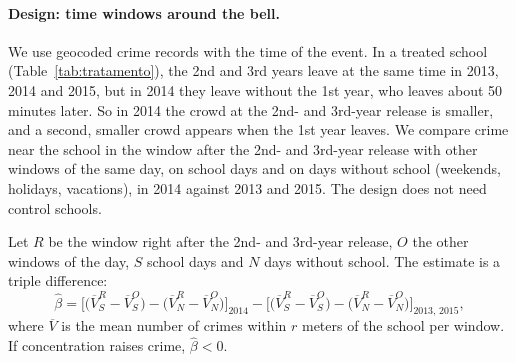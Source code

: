 \documentclass[11pt]{article}
\begin{document}
\paragraph{Design: time windows around the bell.} We use geocoded crime
records with the time of the event. In a treated school
(Table~\ref{tab:tratamento}), the 2nd and 3rd years leave at the same time in
2013, 2014 and 2015, but in 2014 they leave without the 1st year, who leaves
about 50 minutes later. So in 2014 the crowd at the 2nd- and 3rd-year release is
smaller, and a second, smaller crowd appears when the 1st year leaves. We
compare crime near the school in the window after the 2nd- and 3rd-year release
with other windows of the same day, on school days and on days without school
(weekends, holidays, vacations), in 2014 against 2013 and 2015. The design does
not need control schools.

Let $R$ be the window right after the 2nd- and 3rd-year release, $O$ the other
windows of the day, $S$ school days and $N$ days without school. The estimate
is a triple difference:
\begin{equation}
  \hat\beta = \Big[\big(\overline{V}^{R}_{S} - \overline{V}^{O}_{S}\big)
  - \big(\overline{V}^{R}_{N} - \overline{V}^{O}_{N}\big)\Big]_{2014}
  - \Big[\big(\overline{V}^{R}_{S} - \overline{V}^{O}_{S}\big)
  - \big(\overline{V}^{R}_{N} - \overline{V}^{O}_{N}\big)\Big]_{2013,\,2015},
\end{equation}
where $\overline{V}$ is the mean number of crimes within $r$ meters of the
school per window. If concentration raises crime, $\hat\beta<0$.
\end{document}
